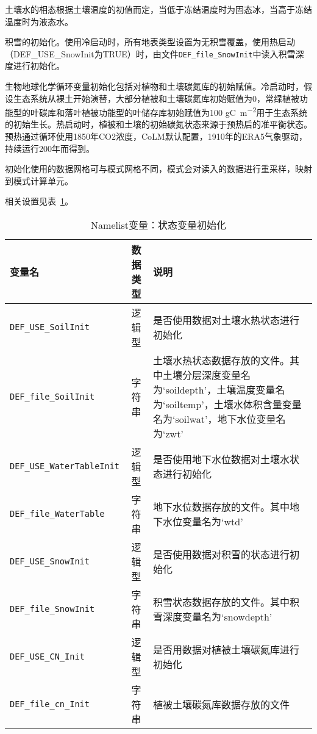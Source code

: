 土壤水的相态根据土壤温度的初值而定，当低于冻结温度时为固态冰，当高于冻结温度时为液态水。

积雪的初始化。使用冷启动时，所有地表类型设置为无积雪覆盖，使用热启动（DEF\_USE\_SnowInit为TRUE）时，由文件\texttt{DEF\_file\_SnowInit}中读入积雪深度进行初始化。

生物地球化学循环变量初始化包括对植物和土壤碳氮库的初始赋值。冷启动时，假设生态系统从裸土开始演替，大部分植被和土壤碳氮库初始赋值为0，常绿植被功能型的叶碳库和落叶植被功能型的叶储存库初始赋值为100  \unit{gC.m^{-2}}用于生态系统的初始生长。热启动时，植被和土壤的初始碳氮状态来源于预热后的准平衡状态。预热通过循环使用1850年CO2浓度，CoLM默认配置，1910年的ERA5气象驱动，持续运行200年而得到。

初始化使用的数据网格可与模式网格不同，模式会对读入的数据进行重采样，映射到模式计算单元。

相关设置见表~\ref{table_nl_ini}。

\begin{table}[!htbp] \small
\caption{Namelist变量：状态变量初始化}
\label{table_nl_ini}
\centering \renewcommand{\arraystretch}{1.5}
\begin{tabular}{lcp{}}
\toprule
\textbf{变量名} & \textbf{数据类型} & \textbf{说明} \\\midrule
\texttt{DEF\_USE\_SoilInit} & 逻辑型 & 是否使用数据对土壤水热状态进行初始化 \\
\texttt{DEF\_file\_SoilInit} & 字符串 & 土壤水热状态数据存放的文件。其中土壤分层深度变量名为`soildepth'，土壤温度变量名为`soiltemp'，土壤水体积含量变量名为`soilwat'，地下水位变量名为`zwt' \\
\texttt{DEF\_USE\_WaterTableInit} & 逻辑型 & 是否使用地下水位数据对土壤水状态进行初始化 \\
\texttt{DEF\_file\_WaterTable} & 字符串 & 地下水位数据存放的文件。其中地下水位变量名为`wtd' \\
\texttt{DEF\_USE\_SnowInit} & 逻辑型 & 是否使用数据对积雪的状态进行初始化 \\
\texttt{DEF\_file\_SnowInit} & 字符串 & 积雪状态数据存放的文件。其中积雪深度变量名为`snowdepth' \\
\texttt{DEF\_USE\_CN\_Init} & 逻辑型 & 是否用数据对植被土壤碳氮库进行初始化 \\
\texttt{DEF\_file\_cn\_Init} & 字符串 & 植被土壤碳氮库数据存放的文件 \\
\bottomrule
\end{tabular}
\end{table}

\clearpage

